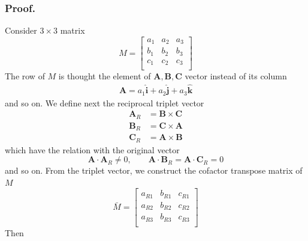 \documentclass[../../../main.tex]{subfiles}
\begin{document}
\subsubsection{Proof.}
Consider $3 \times  3$ matrix
\begin{equation*}
	M=
	\begin{bmatrix}
		a_1 & a_2 & a_3 \\
		b_1 & b_2 & b_3 \\
		c_1 & c_2 & c_3 \\
	\end{bmatrix}
\end{equation*}
The row of $M$ is thought the element of $\mathbf{A},\mathbf{B },\mathbf{C}$ vector instead of its column
\begin{align*}
	\mathbf{A}=a_1 \mathbf{\hat{i}}+a_2 \mathbf{\hat{j }}+a_3 \mathbf{\hat{k}} 
\end{align*}
and so on.
We define next the reciprocal triplet vector
\begin{align*}
	\mathbf{A}_R & =\mathbf{B }\times \mathbf{C } \\
	\mathbf{B}_R & =\mathbf{C }\times \mathbf{A } \\
	\mathbf{C}_R & =\mathbf{A }\times \mathbf{B } 
\end{align*}
which have the relation with the original vector
\begin{equation*}
	\mathbf{A }\cdot  \mathbf{A}_R\neq0,\qquad \mathbf{A }\cdot  \mathbf{B }_R=\mathbf{A }\cdot  \mathbf{C}_R=0
\end{equation*}
and so on.
From the triplet vector, we construct the cofactor transpose matrix of $M$
\begin{equation*}
	\bar{M }=
	\begin{bmatrix}
		a_{R1} & b_{R1} & c_{R1} \\
		a_{R2} & b_{R2} & c_{R2} \\
		a_{R3} & b_{R3} & c_{R3} \\
	\end{bmatrix}
\end{equation*}
Then
\end{document}
